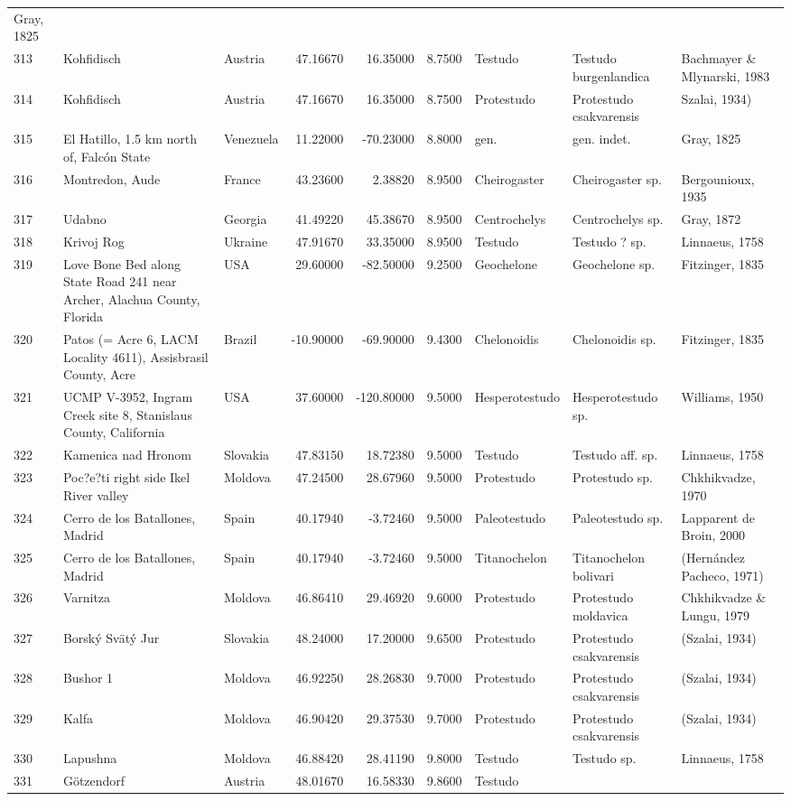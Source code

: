 \documentclass[]{article}
\begin{document}
\begin{longtable}[]{@{}lllrrrlll@{}}
Gray, 1825\tabularnewline
313 & Kohfidisch & Austria & 47.16670 & 16.35000 & 8.7500 & Testudo &
Testudo burgenlandica & Bachmayer \& Mlynarski, 1983\tabularnewline
314 & Kohfidisch & Austria & 47.16670 & 16.35000 & 8.7500 & Protestudo &
Protestudo csakvarensis & Szalai, 1934)\tabularnewline
315 & El Hatillo, 1.5 km north of, Falcón State & Venezuela & 11.22000 &
-70.23000 & 8.8000 & gen. & gen. indet. & Gray, 1825\tabularnewline
316 & Montredon, Aude & France & 43.23600 & 2.38820 & 8.9500 &
Cheirogaster & Cheirogaster sp. & Bergounioux, 1935\tabularnewline
317 & Udabno & Georgia & 41.49220 & 45.38670 & 8.9500 & Centrochelys &
Centrochelys sp. & Gray, 1872\tabularnewline
318 & Krivoj Rog & Ukraine & 47.91670 & 33.35000 & 8.9500 & Testudo &
Testudo ? sp. & Linnaeus, 1758\tabularnewline
319 & Love Bone Bed along State Road 241 near Archer, Alachua County,
Florida & USA & 29.60000 & -82.50000 & 9.2500 & Geochelone & Geochelone
sp. & Fitzinger, 1835\tabularnewline
320 & Patos (= Acre 6, LACM Locality 4611), Assisbrasil County, Acre &
Brazil & -10.90000 & -69.90000 & 9.4300 & Chelonoidis & Chelonoidis sp.
& Fitzinger, 1835\tabularnewline
321 & UCMP V-3952, Ingram Creek site 8, Stanislaus County, California &
USA & 37.60000 & -120.80000 & 9.5000 & Hesperotestudo & Hesperotestudo
sp. & Williams, 1950\tabularnewline
322 & Kamenica nad Hronom & Slovakia & 47.83150 & 18.72380 & 9.5000 &
Testudo & Testudo aff. sp. & Linnaeus, 1758\tabularnewline
323 & Poc?e?ti right side Ikel River valley & Moldova & 47.24500 &
28.67960 & 9.5000 & Protestudo & Protestudo sp. & Chkhikvadze,
1970\tabularnewline
324 & Cerro de los Batallones, Madrid & Spain & 40.17940 & -3.72460 &
9.5000 & Paleotestudo & Paleotestudo sp. & Lapparent de Broin,
2000\tabularnewline
325 & Cerro de los Batallones, Madrid & Spain & 40.17940 & -3.72460 &
9.5000 & Titanochelon & Titanochelon bolivari & (Hernández Pacheco,
1971)\tabularnewline
326 & Varnitza & Moldova & 46.86410 & 29.46920 & 9.6000 & Protestudo &
Protestudo moldavica & Chkhikvadze \& Lungu, 1979\tabularnewline
327 & Borský Svätý Jur & Slovakia & 48.24000 & 17.20000 & 9.6500 &
Protestudo & Protestudo csakvarensis & (Szalai, 1934)\tabularnewline
328 & Bushor 1 & Moldova & 46.92250 & 28.26830 & 9.7000 & Protestudo &
Protestudo csakvarensis & (Szalai, 1934)\tabularnewline
329 & Kalfa & Moldova & 46.90420 & 29.37530 & 9.7000 & Protestudo &
Protestudo csakvarensis & (Szalai, 1934)\tabularnewline
330 & Lapushna & Moldova & 46.88420 & 28.41190 & 9.8000 & Testudo &
Testudo sp. & Linnaeus, 1758\tabularnewline
331 & Götzendorf & Austria & 48.01670 & 16.58330 & 9.8600 & Testudo &

\end{longtable}
\end{document}
